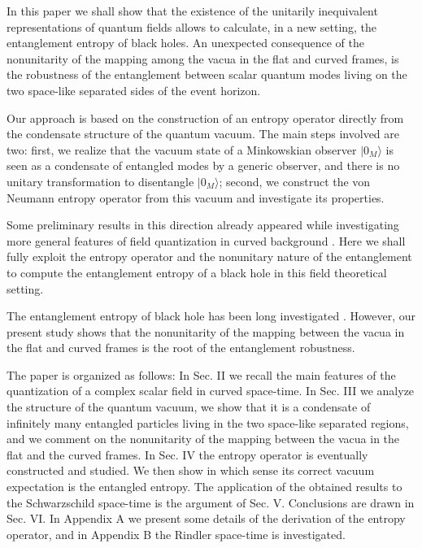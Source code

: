  In this paper we shall show that the existence of the
unitarily inequivalent representations of quantum fields allows to
calculate, in a new setting, the entanglement entropy of black
holes. An unexpected consequence of the nonunitarity of the
mapping among the vacua in the flat and curved frames, is the
robustness of the entanglement between scalar quantum modes living
on the two space-like separated sides of the event horizon.

 Our approach is based on the construction of an entropy
operator directly from the condensate structure of the quantum
vacuum. The main steps involved are two: first, we realize that
the vacuum state of a Minkowskian observer $|0_M \rangle$ is seen
as a condensate of entangled modes by a generic observer, and
there is no unitary transformation to disentangle $|0_M \rangle$;
second, we construct the von Neumann entropy operator from this
vacuum and investigate its properties.

 Some preliminary results in this direction already
appeared while investigating more general features of field
quantization in curved background
\cite{Martellini:sm,Iorio:2001te}. Here we shall fully exploit the
entropy operator and the nonunitary nature of the entanglement to
compute the entanglement entropy of a black hole in this field
theoretical setting.

 The entanglement entropy of black hole has been long
investigated
\cite{Bombelli:1986rw,Mukohyama:1996yi,Terashima:1999vw,frolov1}.
However, our present study shows that the nonunitarity of the
mapping between the vacua in the flat and curved frames is the
root of the entanglement robustness.

 The paper is organized as follows: In Sec. II we recall
the main features of the quantization of a complex scalar field in
curved space-time. In Sec. III we analyze the structure of the
quantum vacuum, we show that it is a condensate of infinitely many
entangled particles living in the two space-like separated
regions, and we comment on the nonunitarity of the mapping
between the vacua in the flat and the curved frames. In Sec. IV
the entropy operator is eventually constructed and studied. We
then show in which sense its correct vacuum expectation is the
entangled entropy. The application of the obtained results to the
Schwarzschild space-time is the argument of Sec. V. Conclusions
are drawn in Sec. VI. In Appendix A we present some details of
the derivation of the entropy operator, and in Appendix B the
Rindler space-time is investigated.

